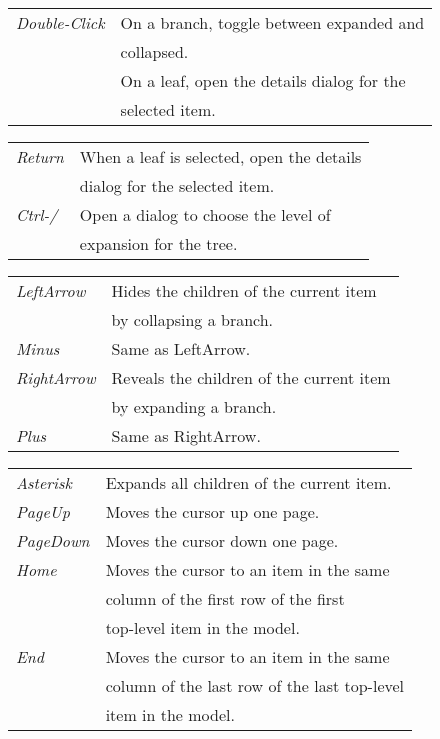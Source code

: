 \documentclass[10pt,landscape]{article}
\begin{document}
\begin{multicols}{3}
\begin{tabular}{@{}ll@{}}
\emph{Double-Click}
    & On a branch, toggle between expanded and \\
    & collapsed. \\
    & On a leaf, open the details dialog for the \\
    & selected item. \\
\end{tabular}
\begin{tabular}{@{}ll@{}}
\emph{Return}
    & When a leaf is selected, open the details \\
    & dialog for the selected item. \\
\emph{Ctrl-/}
    & Open a dialog to choose the level of \\
    & expansion for the tree. \\
\end{tabular}
\begin{tabular}{@{}ll@{}}
\emph{LeftArrow}
    & Hides the children of the current item \\
    & by collapsing a branch. \\
\emph{Minus}
    & Same as LeftArrow. \\
\emph{RightArrow}
    & Reveals the children of the current item \\
    & by expanding a branch. \\
\emph{Plus}
    & Same as RightArrow. \\
\end{tabular}
\begin{tabular}{@{}ll@{}}
\emph{Asterisk}
    & Expands all children of the current item. \\
\emph{PageUp}
    & Moves the cursor up one page. \\
\emph{PageDown}
    & Moves the cursor down one page. \\
\emph{Home}
    & Moves the cursor to an item in the same \\
    & column of the first row of the first \\
    & top-level item in the model. \\
\emph{End}
    & Moves the cursor to an item in the same \\
    & column of the last row of the last top-level \\
    & item in the model. \\
\end{tabular}



\end{multicols}
\end{document}
